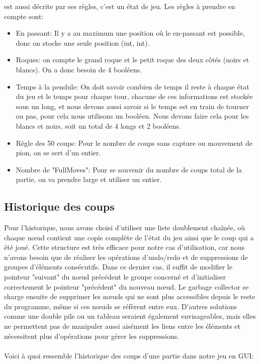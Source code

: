 \documentclass{article}
\begin{document}
est aussi décrite par ses règles, c'est un état de jeu. Les règles à prendre en compte sont:\\
\begin{itemize}
   \item En passant: Il y a au maximum une position où le en-passant est possible, donc on stocke une seule position (int, int).
    \item Roques: on compte le grand roque et le petit roque des deux côtés (noirs et blancs). On a donc besoin de 4 booléens.
   \item Temps à la pendule: On doit savoir combien de temps il reste à chaque état du jeu et le temps pour chaque tour, chacune de ces informations est stockée sous un long, et nous devons aussi savoir si le temps est en train de tourner ou pas, pour cela nous utilisons un booléen. Nous devons faire cela pour les blancs et noirs, soit un total de 4 longs et 2 booléens.
   \item Règle des 50 coups: Pour le nombre de coups sans capture ou mouvement de pion, on se sert d’un entier.
   \item Nombre de "FullMoves": Pour se souvenir du nombre de coups total de la partie, on va prendre large et utiliser un entier.\\
\end{itemize}

\subsection{Historique des coups}
\par Pour l'historique, nous avons choisi d'utiliser une liste doublement chaînée, où chaque nœud contient une copie complète de l'état du jeu ainsi que le coup qui a été joué.
Cette structure est très efficace pour notre cas d'utilisation, car nous n'avons besoin que de réaliser les opérations d'undo/redo et de suppressions de groupes d'éléments consécutifs. Dans ce dernier cas, il suffit de modifier le pointeur "suivant" du nœud précédent le groupe concerné et d'initialiser correctement le pointeur "précédent" du nouveau nœud. Le garbage collector se charge ensuite de supprimer les nœuds qui ne sont plus accessibles depuis le reste du programme, même si ces nœuds se réfèrent entre eux.
D'autres solutions comme une double pile ou un tableau seraient également envisageables, mais elles ne permettent pas de manipuler aussi aisément les liens entre les éléments et nécessitent plus d'opérations pour gérer les suppressions.
\\
\\Voici à quoi ressemble l'historique des coups d'une partie dans notre jeu en GUI:\\
\end{document}

